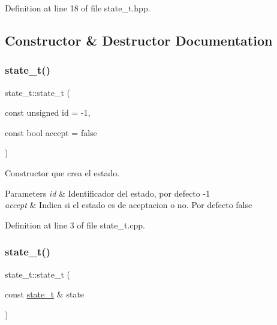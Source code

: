 Definition at line 18 of file state\+\_\+t.\+hpp.



\subsection{Constructor \& Destructor Documentation}
\mbox{\label{classstate__t_a424022379fa10074d6871d6123c8f320}} 
\subsubsection{\texorpdfstring{state\+\_\+t()}{state\_t()}\hspace{0.1cm}{\footnotesize\ttfamily [1/2]}}
{\footnotesize\ttfamily state\+\_\+t\+::state\+\_\+t (\begin{DoxyParamCaption}\item[{const unsigned}]{id = {\ttfamily -\/1},  }\item[{const bool}]{accept = {\ttfamily false} }\end{DoxyParamCaption})}



Constructor que crea el estado. 


\begin{DoxyParams}{Parameters}
{\em id} & Identificador del estado, por defecto -\/1 \\
\hline
{\em accept} & Indica si el estado es de aceptacion o no. Por defecto false \\
\hline
\end{DoxyParams}


Definition at line 3 of file state\+\_\+t.\+cpp.

\mbox{\label{classstate__t_a0927d11d7e1113c51d090e7261c41ed3}} 
\subsubsection{\texorpdfstring{state\+\_\+t()}{state\_t()}\hspace{0.1cm}{\footnotesize\ttfamily [2/2]}}
{\footnotesize\ttfamily state\+\_\+t\+::state\+\_\+t (\begin{DoxyParamCaption}\item[{const \hyperlink{classstate__t}{state\+\_\+t} \&}]{state }\end{DoxyParamCaption})}



